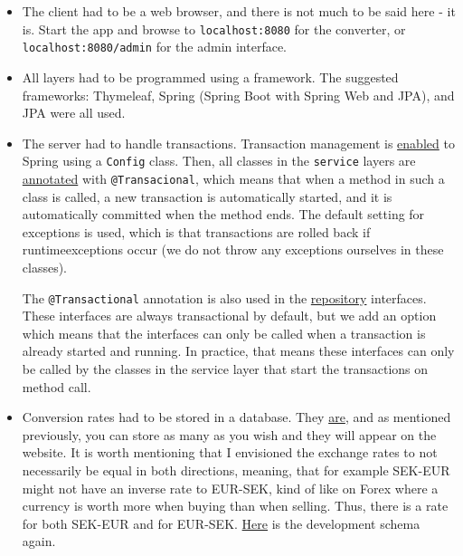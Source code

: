 \documentclass[a4paper]{scrartcl}
\def\code#1{\texttt{#1}}
\begin{document}
\begin{itemize}
    \item The client had to be a web browser, and there is not much to be said here - it is. Start the app and browse to \code{localhost:8080} for the converter, or \code{localhost:8080/admin} for the admin interface.

    \item All layers had to be programmed using a framework. The suggested frameworks: Thymeleaf, Spring (Spring Boot with Spring Web and JPA), and JPA were all used.

    \item The server had to handle transactions. Transaction management is \href{https://github.com/fongie/CurrencyConverter/blob/master/currencyconverter/src/main/java/se/kth/korlinge/currencyconverter/config/Config.java#L9}{enabled} to Spring using a \code{Config} class. Then, all classes in the \code{service} layers are \href{https://github.com/fongie/CurrencyConverter/blob/master/currencyconverter/src/main/java/se/kth/korlinge/currencyconverter/services/ConvertService.java#L29}{annotated} with \code{@Transacional}, which means that when a method in such a class is called, a new transaction is automatically started, and it is automatically committed when the method ends. The default setting for exceptions is used, which is that transactions are rolled back if runtimeexceptions occur (we do not throw any exceptions ourselves in these classes).

        The \code{@Transactional} annotation is also used in the \href{https://github.com/fongie/CurrencyConverter/blob/master/currencyconverter/src/main/java/se/kth/korlinge/currencyconverter/repositories/RateRepository.java#L16}{repository} interfaces. These interfaces are always transactional by default, but we add an option which means that the interfaces can only be called when a transaction is already started and running. In practice, that means these interfaces can only be called by the classes in the service layer that start the transactions on method call.

    \item Conversion rates had to be stored in a database. They \href{https://github.com/fongie/CurrencyConverter/blob/master/currencyconverter/src/main/java/se/kth/korlinge/currencyconverter/data/Rate.java}{are}, and as mentioned previously, you can store as many as you wish and they will appear on the website. It is worth mentioning that I envisioned the exchange rates to not necessarily be equal in both directions, meaning, that for example SEK-EUR might not have an inverse rate to EUR-SEK, kind of like on Forex where a currency is worth more when buying than when selling. Thus, there is a rate for both SEK-EUR and for EUR-SEK. \href{https://github.com/fongie/CurrencyConverter/blob/master/currencyconverter/src/main/resources/schema.sql}{Here} is the development schema again.


\end{itemize}
\end{document}
